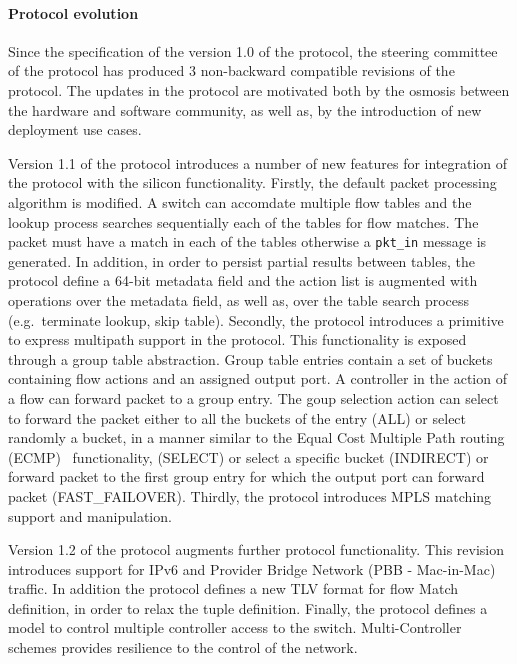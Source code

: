 \paragraph{Protocol evolution} 

Since the specification of the version 1.0 of the protocol, the steering
committee of the protocol has produced 3 non-backward compatible revisions of
the protocol. The updates in the protocol are motivated both by the osmosis
between the hardware and software \of community, as well as, by the introduction
of new deployment use cases. 

Version 1.1 of the protocol introduces a number of new features for
integration of the protocol with the silicon functionality. Firstly, the
default packet processing algorithm is modified. A switch can accomdate multiple
flow tables and the lookup process searches sequentially each of the
tables for flow matches. The packet must have a match in each of the tables
otherwise a {\tt pkt\_in} message
is generated. In addition, in order to persist partial results between
tables, the protocol define a 64-bit metadata field and the
action list is augmented with operations over the metadata field, as well
as, over the table search process (e.g.~terminate lookup, skip table).
Secondly, the protocol introduces a primitive to express multipath support in
the protocol. This functionality is exposed through a group table abstraction.
Group table entries contain a set of buckets containing flow actions and an
assigned output port. A controller in the action of a flow can 
forward packet to a group entry. The goup selection action can select to forward
the packet either to all the buckets of the entry (ALL) or select randomly a
bucket, in a manner similar to the Equal Cost Multiple Path routing
(ECMP)~\cite{RFC2992} functionality, (SELECT) or select a specific bucket
(INDIRECT) or forward packet to the first group entry for which the output port
can forward packet (FAST\_FAILOVER).  Thirdly, the protocol introduces MPLS
matching support and manipulation.

Version 1.2 of the protocol augments further protocol functionality. This
revision introduces support for IPv6 and Provider Bridge Network (PBB -
Mac-in-Mac) traffic. In addition the protocol defines a new TLV format for flow
Match definition, in order to relax the \of tuple definition.  Finally, the
protocol defines a model to control multiple controller access to the switch.
Multi-Controller schemes provides resilience to the control of the network. 

